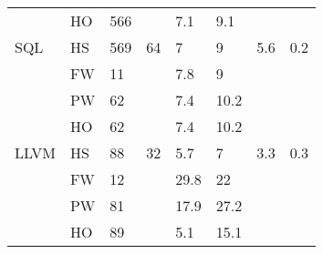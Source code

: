 \begin{figure*}[!t]
\begin{tabular}{|l|l|l|l|l|l|l|l|}
                                   & HO                              & 566                             &                                            & \cellcolor[HTML]{C0C0C0}7.1  & \cellcolor[HTML]{C0C0C0}9.1  &                       &                       \\ \cline{2-3} \cline{5-6}
\multirow{-4}{*}{SQL}              & HS                              & 569                             & \multirow{-4}{*}{64}                       & \cellcolor[HTML]{C0C0C0}7    & \cellcolor[HTML]{C0C0C0}9    & \multirow{-4}{*}{5.6} & \multirow{-4}{*}{0.2} \\ \hline
                                   & FW                              & 11                              &                                            & \cellcolor[HTML]{C0C0C0}7.8  & \cellcolor[HTML]{C0C0C0}9    &                       &                       \\ \cline{2-3} \cline{5-6}
                                   & PW                              & 62                              &                                            & \cellcolor[HTML]{C0C0C0}7.4  & \cellcolor[HTML]{C0C0C0}10.2 &                       &                       \\ \cline{2-3} \cline{5-6}
                                   & HO                              & 62                              &                                            & \cellcolor[HTML]{C0C0C0}7.4  & \cellcolor[HTML]{C0C0C0}10.2 &                       &                       \\ \cline{2-3} \cline{5-6}
\multirow{-4}{*}{LLVM}             & HS                              & 88                              & \multirow{-4}{*}{32}                       & \cellcolor[HTML]{C0C0C0}5.7  & \cellcolor[HTML]{C0C0C0}7    & \multirow{-4}{*}{3.3} & \multirow{-4}{*}{0.3} \\ \hline
                                   & FW                              & 12                              &                                            & \cellcolor[HTML]{C0C0C0}29.8 & \cellcolor[HTML]{C0C0C0}22   &                       &                       \\ \cline{2-3} \cline{5-6}
                                   & PW                              & 81                              &                                            & \cellcolor[HTML]{C0C0C0}17.9 & \cellcolor[HTML]{C0C0C0}27.2 &                       &                       \\ \cline{2-3} \cline{5-6}
                                   & HO                              & 89                              &                                            & 5.1                          & 15.1                         &                       &                       \\ \cline{2-3} \cline{5-6}

\end{tabular}
\end{figure*}
